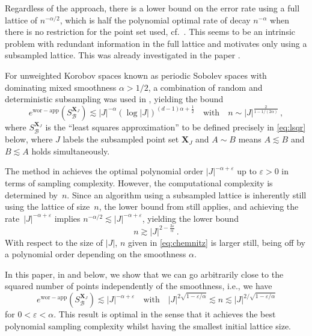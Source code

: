 \documentclass[a4paper]{amsart}
\newcommand{\ewc}{e^{\mathrm{wor-app}}}
\begin{document}
Regardless of the approach, there is a lower bound on the error rate using a full lattice of $n^{-\alpha/2}$, which is half the polynomial optimal rate of decay $n^{-\alpha}$ when there is no restriction for the point set used, cf.\ \cite{BKUV17}.
This seems to be an intrinsic problem with redundant information in the full lattice and motivates only using a subsampled lattice.
This was already investigated in the paper \cite{BKPU22}.

For unweighted Korobov spaces known as periodic Sobolev spaces with dominating mixed smoothness $\alpha>1/2$, a combination of random and deterministic subsampling was used in \cite[Corollary~1.2]{BKPU22}, yielding the bound
    \begin{equation}\label{eq:chemnitz}
        \ewc(S_{\mathcal B}^{\bm X_J})
        \lesssim |J|^{-\alpha} (\log|J|)^{(d-1)\alpha+\frac 12}
        \quad\text{with}\quad
        n \sim |J|^{\frac{2}{1-1/(2\alpha)}}
        \,,
    \end{equation}
    where $S_{\mathcal B}^{\bm X_J}$ is the ``least squares approximation'' to be defined precisely in \eqref{eq:lsqr} below, where $J$ labels the subsampled point set $\bm X_J$ and $A\sim B$ means $A\lesssim B$ and $B\lesssim A$ holds simultaneously.



The method in \cite{BKPU22} achieves the optimal polynomial order $|J|^{-\alpha+\varepsilon}$ up to $\varepsilon>0$ in terms of sampling complexity.
However, the computational complexity is determined by~$n$.
Since an algorithm using a subsampled lattice is inherently still using the lattice of size~$n$, the lower bound from \cite{BKUV17} still applies, and achieving the rate~$|J|^{-\alpha+\varepsilon}$ implies $n^{-\alpha/2} \lesssim |J|^{-\alpha+\varepsilon}$, yielding the lower bound
\begin{equation*}
    n \gtrsim |J|^{2-\frac{2\varepsilon}{\alpha}} \,.
\end{equation*}
With respect to the size of $|J|$, $n$ given in \eqref{eq:chemnitz} is larger still, being off by a polynomial order depending on the smoothness $\alpha$.

In this paper, in  and  below, we show that we can go arbitrarily close to the squared number of points independently of the smoothness, i.e., we have
\begin{equation*}
    \ewc(S_{\mathcal B}^{\bm X_J})
    \lesssim |J|^{-\alpha+\varepsilon}
    \quad\text{with}\quad
    |J|^{2\sqrt{1-\varepsilon/\alpha}}
    \lesssim
    n
    \lesssim
    |J|^{2/\sqrt{1-\varepsilon/\alpha}}
\end{equation*}
for $0<\varepsilon<\alpha$.
This result is optimal in the sense that it achieves the best polynomial sampling complexity whilst having the smallest initial lattice size.
\end{document}

